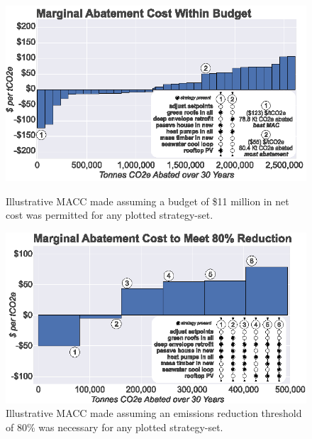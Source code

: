 \documentclass[twocolumn, a4paper,10pt]{article}
\begin{document}
\begin{figure}[hbpt]
\centering
\begin{minipage}[b]{.45\textwidth}
    \hspace*{-1.05cm}\includegraphics[scale=1.0]{figures/budget_macc.eps}
    \caption{Illustrative MACC made assuming a budget of \$11 million in net cost was permitted for any plotted strategy-set.}
    \label{fig:MACC_budget}
\end{minipage}\qquad
\begin{minipage}[b]{.45\textwidth}
    \hspace*{-.4cm}\includegraphics[scale=1.0]{figures/threshold_macc.eps}
    \caption{Illustrative MACC made assuming an emissions reduction threshold of 80\% was necessary for any plotted strategy-set.}
    \label{fig:MACC_threshold}
\end{minipage}
\end{figure}
\end{document}
